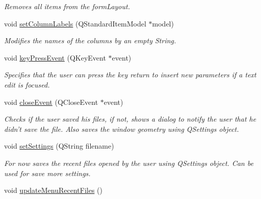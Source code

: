 \begin{DoxyCompactItemize}
\begin{DoxyCompactList}\small\item\em Removes all items from the form\-Layout. \end{DoxyCompactList}\item 
void \hyperlink{classMainWindow_aed133479c6ee8b81e351af9db464a9a7}{set\-Column\-Labels} (Q\-Standard\-Item\-Model $\ast$model)
\begin{DoxyCompactList}\small\item\em Modifies the names of the columns by an empty String. \end{DoxyCompactList}\item 
void \hyperlink{classMainWindow_a9c4f542263838b9ecd06eae839a42a34}{key\-Press\-Event} (Q\-Key\-Event $\ast$event)
\begin{DoxyCompactList}\small\item\em Specifies that the user can press the key return to insert new parameters if a text edit is focused. \end{DoxyCompactList}\item 
void \hyperlink{classMainWindow_a4e20a4a065fbb0e4d3532a45a0a91425}{close\-Event} (Q\-Close\-Event $\ast$event)
\begin{DoxyCompactList}\small\item\em Checks if the user saved his files, if not, shows a dialog to notify the user that he didn't save the file. Also saves the window geometry using Q\-Settings object. \end{DoxyCompactList}\item 
void \hyperlink{classMainWindow_a1ec3a16af19b96d0fd9cdf46cc892937}{set\-Settings} (Q\-String filename)
\begin{DoxyCompactList}\small\item\em For now saves the recent files opened by the user using Q\-Settings object. Can be used for save more settings. \end{DoxyCompactList}\item 
\hypertarget{classMainWindow_a596984787bd143548c5afac3cd582f1c}{void \hyperlink{classMainWindow_a596984787bd143548c5afac3cd582f1c}{update\-Menu\-Recent\-Files} ()}\label{classMainWindow_a596984787bd143548c5afac3cd582f1c}


\end{DoxyCompactItemize}
